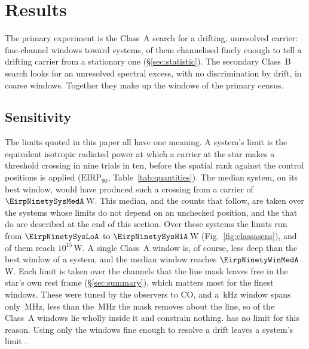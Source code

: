 \section{Results}
\label{sec:results}

The primary experiment is the Class~A search for a drifting, unresolved
carrier: \NWinA{} fine-channel windows toward \NSysClassA{} systems,
\EdrNWinA{} of them channelised finely enough to tell a drifting carrier from
a stationary one (\S\ref{sec:statistic}). The secondary Class~B search looks
for an unresolved spectral excess, with no discrimination by drift, in
\NWinB{} coarse windows. Together they make up the \NWindows{} windows of the
primary census.

\subsection{Sensitivity}
\label{sec:pninetysel}

The limits quoted in this paper all have one meaning. A system's limit is
the equivalent isotropic radiated power at which a carrier at the star makes
a threshold crossing in nine trials in ten, before the spatial rank against
the control positions is applied ($\mathrm{EIRP}_{90}$,
Table~\ref{tab:quantities}). The median system, on its best window, would
have produced such a crossing from a carrier of $\EirpNinetySysMedA$\,W.
This median, and the
counts that follow, are taken over the \NSysALimSum{} systems whose limits do
not depend on an unchecked position, and the \OmNFlagWord{} that do are
described at the end of this section. Over these systems the limits run from $\EirpNinetySysLoA$ to
$\EirpNinetySysHiA$\,W (Fig.~\ref{fig:classasens}), and \NSysEfifteen{} of
them reach $10^{15}$\,W. A single Class~A window is, of course, less deep than
the best window of a system, and the median window reaches
$\EirpNinetyWinMedA$\,W. Each limit is taken over the channels that the line
mask leaves free in the star's own rest frame (\S\ref{sec:summary}), which
matters most for the finest windows. These were tuned by the observers to CO,
and a \UmFineChanKHz\,kHz window spans only \UmFineBwMHz\,MHz, less than the
\UmFineMaskMHz\,MHz the mask removes about the line, so \UmNWinAFull{} of the
Class~A windows lie wholly inside it and constrain nothing. \NSysALostName{}
has no limit for this reason. Using only the \EdrNWinA{} windows fine enough
to resolve a drift leaves a system's limit \ScEdrMedClause.

